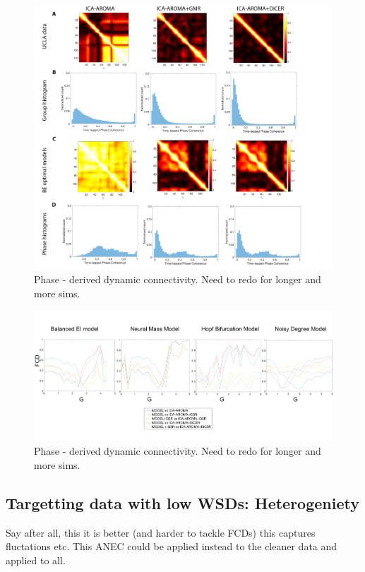 \documentclass[oneside]{zHenriquesLab-StyleBioRxiv}
\begin{document}
\begin{figure}[ht!]
\includegraphics[width=1\textwidth]{figs/FCD_BEI_data.png}
\caption{Phase - derived dynamic connectivity. Need to redo for longer and more sims.}\label{fig:FCD_model_BEI}
\end{figure}

\begin{figure}[ht!]
\includegraphics[width=1\textwidth]{figs/FCD_all.png}
\caption{Phase - derived dynamic connectivity. Need to redo for longer and more sims.}\label{fig:FCD_all_fits}
\end{figure}

\subsection*{Targetting data with low WSDs: Heterogeniety}
Say after all, this it is better (and harder to tackle FCDs) this captures fluctations etc. This ANEC could be applied instead to the cleaner data and applied to all. 
\end{document}
